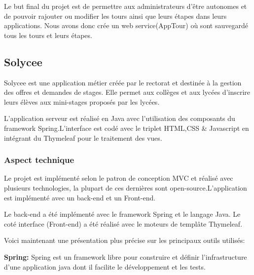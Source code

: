 \documentclass[a4paper]{article}
\begin{document}
Le but final du projet est de permettre aux administrateurs d'être autonomes et de pouvoir rajouter ou modifier les tours ainsi que leurs  étapes dans leurs applications. Nous avons donc crée un web service(AppTour) où sont sauvegardé tous les tours et leurs étapes.

\subsection{Solycee}

Solycee est une application métier créée par le rectorat et destinée à la gestion des offres et demandes de stages. Elle permet aux collèges et aux lycées d'inscrire leurs élèves aux mini-stages proposés par les lycées.  

L'application serveur est réalisé en Java avec l'utilisation des composants du framework Spring.L'interface est codé avec le triplet HTML,CSS \& Javascript en intégrant du Thymeleaf pour le traitement des vues.  

\subsubsection{Aspect technique}

Le projet est implémenté selon le patron de conception MVC et réalisé avec plusieurs technologies, la plupart de ces dernières sont open-source.L'application est implémenté avec un back-end et un Front-end.

Le back-end a été implémenté avec le framework Spring et le langage Java. Le coté interface (Front-end) a été réalisé avec le moteurs de templâte Thymeleaf. 

Voici maintenant une présentation plus précise sur les principaux outils utilisés:

\textbf{Spring:}  Spring est un framework libre pour construire et définir l'infrastructure d'une application java dont il facilite le développement et les tests.
\end{document}
